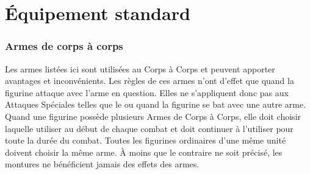 
\part{Équipement standard}

\section{Armes de corps à corps}
\label{close_combat_weapons}

Les armes listées ici sont utilisées au Corps à Corps et peuvent apporter avantages et inconvénients. Les règles de ces armes n'ont d'effet que quand la figurine attaque avec l'arme en question. Elles ne s'appliquent donc pas aux Attaques Spéciales telles que le \stomp{} ou quand la figurine se bat avec une autre arme. Quand une figurine possède plusieurs Armes de Corps à Corps, elle doit choisir laquelle utiliser au début de chaque combat et doit continuer à l'utiliser pour toute la durée du combat. Toutes les figurines ordinaires d'une même unité doivent choisir la même arme. À moins que le contraire ne soit précisé, les montures ne bénéficient jamais des effets des armes.

